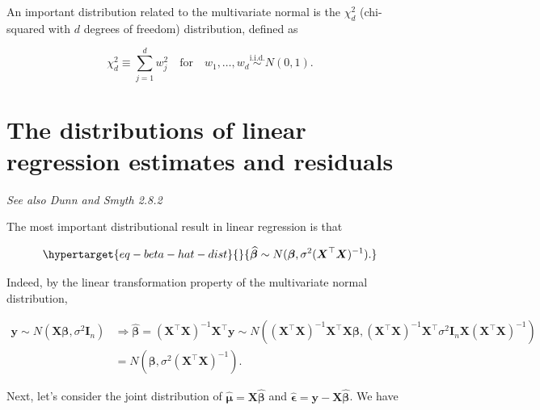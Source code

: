 \documentclass[
  11pt,
  letterpaper,
  oneside]{book}
\theoremstyle{definition}
\theoremstyle{plain}
\theoremstyle{plain}
\theoremstyle{plain}
\theoremstyle{remark}
\begin{document}
An important distribution related to the multivariate normal is the
\(\chi^2_d\) (chi-squared with \(d\) degrees of freedom) distribution,
defined as

\[
\chi^2_d \equiv \sum_{j = 1}^d w_j^2 \quad \text{for} \quad w_1, \dots, w_d \overset{\text{i.i.d.}}{\sim} N(0, 1).
\]

\hypertarget{sec-lin-reg-dist}{%
\section{The distributions of linear regression estimates and
residuals}\label{sec-lin-reg-dist}}

\emph{See also Dunn and Smyth 2.8.2}

The most important distributional result in linear regression is that

\begin{equation}\protect\hypertarget{eq-beta-hat-dist}{}{
\boldsymbol{\widehat{\beta}} \sim N(\boldsymbol{\beta}, \sigma^2 (\boldsymbol{X}^\top \boldsymbol{X})^{-1}).
}\label{eq-beta-hat-dist}\end{equation}

Indeed, by the linear transformation property of the multivariate normal
distribution,

\[
\begin{split}
\boldsymbol{y} \sim N(\boldsymbol{X} \boldsymbol{\beta}, \sigma^2 \boldsymbol{I}_n) &\Longrightarrow \boldsymbol{\widehat{\beta}} = (\boldsymbol{X}^\top \boldsymbol{X})^{-1}\boldsymbol{X}^\top \boldsymbol{y} \sim N((\boldsymbol{X}^\top \boldsymbol{X})^{-1}\boldsymbol{X}^\top \boldsymbol{X} \boldsymbol{\beta}, (\boldsymbol{X}^\top \boldsymbol{X})^{-1}\boldsymbol{X}^\top \sigma^2 \boldsymbol{I}_n \boldsymbol{X}(\boldsymbol{X}^\top \boldsymbol{X})^{-1}) \\
&= N(\boldsymbol{\beta}, \sigma^2 (\boldsymbol{X}^\top \boldsymbol{X})^{-1}).
\end{split}
\]

Next, let's consider the joint distribution of
\(\boldsymbol{\widehat{\mu}} = \boldsymbol{X} \boldsymbol{\widehat{\beta}}\)
and
\(\boldsymbol{\widehat{\epsilon}} = \boldsymbol{y} - \boldsymbol{X} \boldsymbol{\widehat{\beta}}\).
We have
\end{document}
